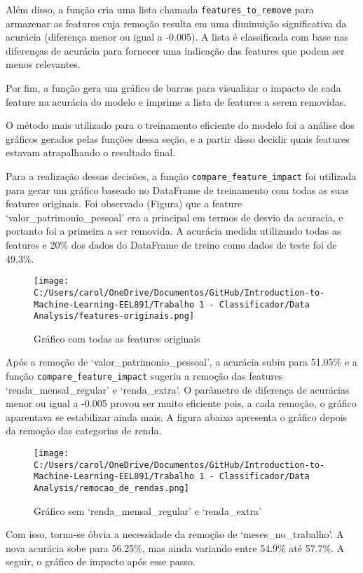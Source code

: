 \documentclass[11pt]{article}
\begin{document}
Além disso, a função cria uma lista chamada
\texttt{features\_to\_remove} para armazenar as features cuja remoção
resulta em uma diminuição significativa da acurácia (diferença menor ou
igual a -0.005). A lista é classificada com base nas diferenças de
acurácia para fornecer uma indicação das features que podem ser menos
relevantes.

Por fim, a função gera um gráfico de barras para visualizar o impacto de
cada feature na acurácia do modelo e imprime a lista de features a serem
removidas.

O método mais utilizado para o treinamento eficiente do modelo foi a
análise dos gráficos gerados pelas funções dessa seção, e a partir disso
decidir quais features estavam atrapalhando o resultado final.

Para a realização dessas decisões, a função
\texttt{compare\_feature\_impact} foi utilizada para gerar um gráfico
baseado no DataFrame de treinamento com todas as suas features
originais. Foi observado (Figura) que a feature
`valor\_patrimonio\_pessoal' era a principal em termos de desvio da
acuracia, e portanto foi a primeira a ser removida. A acurácia medida
utilizando todas as features e 20\% dos dados do DataFrame de treino
como dados de teste foi de 49,3\%.

\begin{figure}
\centering
\texttt{[image: C:/Users/carol/OneDrive/Documentos/GitHub/Introduction-to-Machine-Learning-EEL891/Trabalho 1 - Classificador/Data Analysis/features-originais.png]}
\caption{Gráfico com todas as features originais}
\end{figure}

Após a remoção de `valor\_patrimonio\_pessoal', a acurácia subiu para
51.05\% e a função \texttt{compare\_feature\_impact} sugeriu a remoção
das features `renda\_mensal\_regular' e `renda\_extra'. O parâmetro de
diferença de acurácias menor ou igual a -0.005 provou ser muito
eficiente pois, a cada remoção, o gráfico aparentava se estabilizar
ainda mais. A figura abaixo apresenta o gráfico depois da remoção das
categorias de renda.

\begin{figure}
\centering
\texttt{[image: C:/Users/carol/OneDrive/Documentos/GitHub/Introduction-to-Machine-Learning-EEL891/Trabalho 1 - Classificador/Data Analysis/remocao\_de\_rendas.png]}
\caption{Gráfico sem `renda\_mensal\_regular' e `renda\_extra'}
\end{figure}

Com isso, torna-se óbvia a necessidade da remoção de
`meses\_no\_trabalho'. A nova acurácia sobe para 56.25\%, mas ainda
variando entre 54.9\% até 57.7\%. A seguir, o gráfico de impacto após
esse passo.
\end{document}
